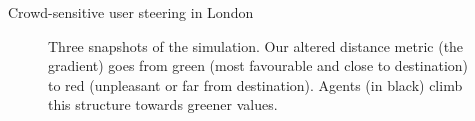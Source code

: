 \documentclass[presentation]{beamer} %
\begin{document}
\begin{frame}{Crowd-sensitive user steering in London}

\begin{figure}[bt]\centering
  \caption{Three snapshots of the simulation. Our altered distance metric (the gradient) goes from green (most favourable and close to destination) to red (unpleasant or far from destination). Agents (in black) climb this structure towards greener values.}
\end{figure}

\end{frame}
\end{document}
